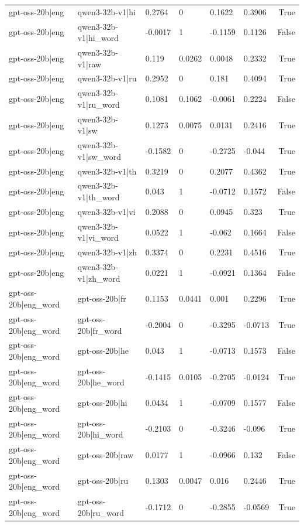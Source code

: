 \begin{table}
\begin{tabular}{llllllr}
gpt-oss-20b|eng & qwen3-32b-v1|hi & 0.2764 & 0 & 0.1622 & 0.3906 & True \\
gpt-oss-20b|eng & qwen3-32b-v1|hi_word & -0.0017 & 1 & -0.1159 & 0.1126 & False \\
gpt-oss-20b|eng & qwen3-32b-v1|raw & 0.119 & 0.0262 & 0.0048 & 0.2332 & True \\
gpt-oss-20b|eng & qwen3-32b-v1|ru & 0.2952 & 0 & 0.181 & 0.4094 & True \\
gpt-oss-20b|eng & qwen3-32b-v1|ru_word & 0.1081 & 0.1062 & -0.0061 & 0.2224 & False \\
gpt-oss-20b|eng & qwen3-32b-v1|sw & 0.1273 & 0.0075 & 0.0131 & 0.2416 & True \\
gpt-oss-20b|eng & qwen3-32b-v1|sw_word & -0.1582 & 0 & -0.2725 & -0.044 & True \\
gpt-oss-20b|eng & qwen3-32b-v1|th & 0.3219 & 0 & 0.2077 & 0.4362 & True \\
gpt-oss-20b|eng & qwen3-32b-v1|th_word & 0.043 & 1 & -0.0712 & 0.1572 & False \\
gpt-oss-20b|eng & qwen3-32b-v1|vi & 0.2088 & 0 & 0.0945 & 0.323 & True \\
gpt-oss-20b|eng & qwen3-32b-v1|vi_word & 0.0522 & 1 & -0.062 & 0.1664 & False \\
gpt-oss-20b|eng & qwen3-32b-v1|zh & 0.3374 & 0 & 0.2231 & 0.4516 & True \\
gpt-oss-20b|eng & qwen3-32b-v1|zh_word & 0.0221 & 1 & -0.0921 & 0.1364 & False \\
gpt-oss-20b|eng_word & gpt-oss-20b|fr & 0.1153 & 0.0441 & 0.001 & 0.2296 & True \\
gpt-oss-20b|eng_word & gpt-oss-20b|fr_word & -0.2004 & 0 & -0.3295 & -0.0713 & True \\
gpt-oss-20b|eng_word & gpt-oss-20b|he & 0.043 & 1 & -0.0713 & 0.1573 & False \\
gpt-oss-20b|eng_word & gpt-oss-20b|he_word & -0.1415 & 0.0105 & -0.2705 & -0.0124 & True \\
gpt-oss-20b|eng_word & gpt-oss-20b|hi & 0.0434 & 1 & -0.0709 & 0.1577 & False \\
gpt-oss-20b|eng_word & gpt-oss-20b|hi_word & -0.2103 & 0 & -0.3246 & -0.096 & True \\
gpt-oss-20b|eng_word & gpt-oss-20b|raw & 0.0177 & 1 & -0.0966 & 0.132 & False \\
gpt-oss-20b|eng_word & gpt-oss-20b|ru & 0.1303 & 0.0047 & 0.016 & 0.2446 & True \\
gpt-oss-20b|eng_word & gpt-oss-20b|ru_word & -0.1712 & 0 & -0.2855 & -0.0569 & True \\

\end{tabular}
\end{table}
